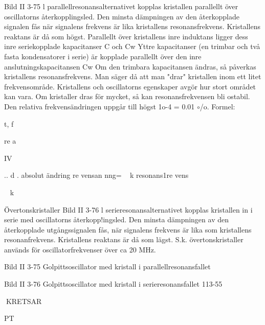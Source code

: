 \documentclass[a4paper,twoside,twocolumn,openright]{book}
\begin{document}
{{{{{{{{Bild II 3-75
l parallellresonansalternativet kopplas
kristallen parallellt över oscillatorns återkopplingsled. Den minsta dämpningen av
den återkopplade signalen fås när signalens
frekvens är lika kristallens resonansfrekvens.
Kristallens reaktans är då som högst.
Parallellt över kristallens inre induktans
ligger dess inre seriekopplade kapacitanser
C och Cw Yttre kapacitanser (en trimbar och
två fasta kondensatorer i serie) är kopplade
parallellt över den inre anslutningskapacitansen Cw
Om den trimbara kapacitansen ändras,
så påverkas kristallens resonansfrekvens.
Man säger då att man "drar" kristallen inom
ett litet frekvensområde. Kristallens och oscillatorns egenskaper avgör hur stort området kan vara. Om kristaller dras för mycket,
så kan resonansfrekvensen bli ostabil.
Den relativa frekvensändringen uppgår
till högst 1o-4 = 0.01 $\circ$/o. Formel:

t, f

re a

IV

.. d .
absolut ändring
re vensan nng=
~ k
resonans1re vens

~ k

Övertonskristaller
Bild II 3-76
l serieresonansalternativet kopplas kristallen in i serie med oscillatorns återkopp!ingsled. Den minsta dämpningen av den
återkopplade utgångssignalen fås, när signalens frekvens är lika som kristallens resonanfrekvens. Kristallens reaktans är då som
lägst. S.k. övertonskristaller används för oscillatorfrekvenser över ca 20 MHz.

Bild II 3-75 Golpittsoscillator med kristall
i parallellresonansfallet

Bild II 3-76 Golpittsoscillator med kristall
i serieresonansfallet
113-55

KRETSAR

PT

}}}}}}}}
\end{document}
